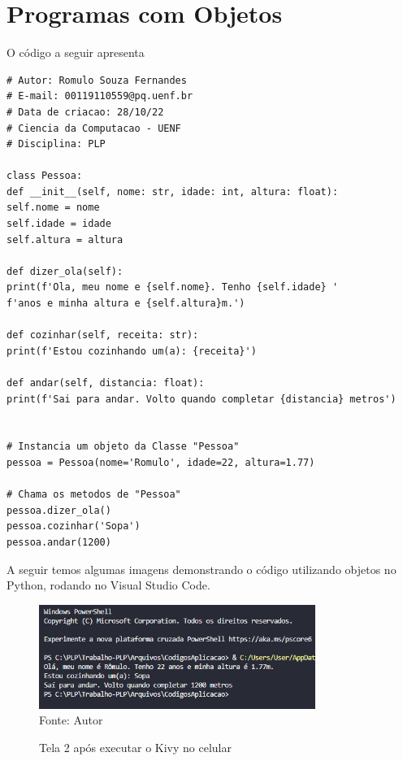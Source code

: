     \section{Programas com Objetos}
    O código a seguir apresenta
\begin{lstlisting}
# Autor: Romulo Souza Fernandes
# E-mail: 00119110559@pq.uenf.br
# Data de criacao: 28/10/22
# Ciencia da Computacao - UENF
# Disciplina: PLP

class Pessoa:
def __init__(self, nome: str, idade: int, altura: float):
self.nome = nome
self.idade = idade
self.altura = altura

def dizer_ola(self):
print(f'Ola, meu nome e {self.nome}. Tenho {self.idade} '
f'anos e minha altura e {self.altura}m.')

def cozinhar(self, receita: str):
print(f'Estou cozinhando um(a): {receita}')

def andar(self, distancia: float):
print(f'Sai para andar. Volto quando completar {distancia} metros')


# Instancia um objeto da Classe "Pessoa"
pessoa = Pessoa(nome='Romulo', idade=22, altura=1.77)

# Chama os metodos de "Pessoa"
pessoa.dizer_ola()
pessoa.cozinhar('Sopa')
pessoa.andar(1200)
\end{lstlisting}
	A seguir temos algumas imagens demonstrando o código utilizando objetos no Python, rodando no Visual Studio Code.
    \begin{figure}[H]
    	\begin{center}
    		\caption{Tela 2 após executar o Kivy no celular} \label{ling1}
    		\includegraphics[width=9cm]{objetos.png} \\
    		{\tiny \sf Fonte:{ Autor}}
    	\end{center}
    \end{figure}
    
